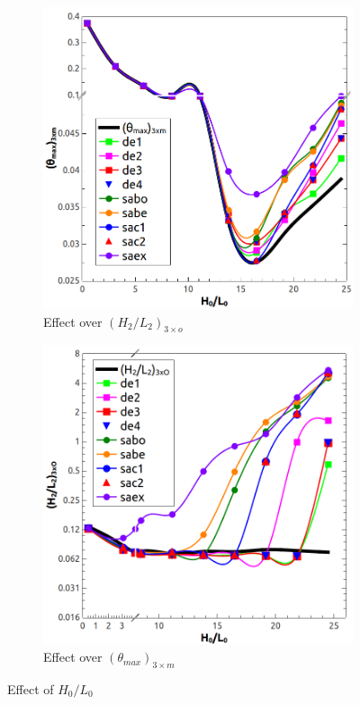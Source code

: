 \documentclass[10pt,fleqn,a4paper,twoside]{article}
\begin{document}
\begin{figure}[!h]
\centering
	\begin{subfigure}{0.52\textwidth}
		\centering
		\includegraphics[width=1\linewidth]{imgs/4dof/h0l0-tmin.png}
		\caption{ {\small Effect over $(H_{2}/L_{2})_{3\times o}$}}
		\label{figure02:sub1}
	\end{subfigure}%
	\begin{subfigure}{0.52\textwidth}
		\centering
		\includegraphics[width=1\linewidth]{imgs/4dof/h0l0-h2l2.png}
		\caption{ {\small Effect over $({\theta}_{max})_{3\times m}$}}
		\label{figure02:sub2}
	\end{subfigure}%
\caption{Effect of $H_{0}/L_{0}$}
\label{figure02}
\end{figure}
\end{document}
